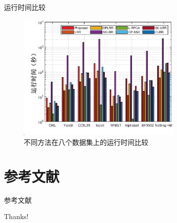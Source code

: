 \documentclass{beamer}
\begin{document}
\begin{frame}{运行时间比较}

\begin{figure}[htbp]
    \centering
    \includegraphics[width=8cm]{pic/7.eps}
    \caption{不同方法在八个数据集上的运行时间比较}
    \label{fig_time}
\end{figure}

\end{frame}



\section{参考文献}

\begin{frame}{参考文献}
    \small
    
      
\end{frame}

\begin{frame}
    \begin{center}
        {\Huge\calligra Thanks!}
    \end{center}
\end{frame}
\end{document}
